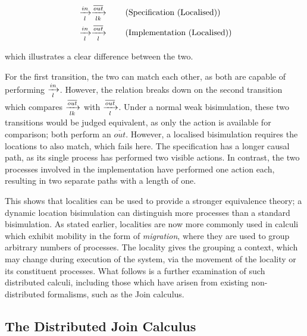 \begin{align}
& \xrightarrow[l]{in} \xrightarrow[lk]{\overline{out}} \tag{Specification
(Localised)} \\
& \xrightarrow[l]{in} \xrightarrow[l]{\overline{out}} \tag{Implementation (Localised)}
\end{align}

\noindent which illustrates a clear difference between the two.

For the first transition, the two can match each other, as both are
capable of performing $\xrightarrow[l]{in}$.  However, the relation
breaks down on the second transition which compares $\xrightarrow[lk]{\overline{out}}$
with $\xrightarrow[l]{\overline{out}}$.  Under a normal weak
bisimulation, these two transitions would be judged equivalent, as only
the action is available for comparison; both perform an
$\overline{out}$.  However, a localised bisimulation requires the
locations to also match, which fails here.  The specification has a
longer causal path, as its single process has performed two visible
actions.  In contrast, the two processes involved in the implementation
have performed one action each, resulting in two separate paths with a
length of one.

This shows that localities can be used to provide a stronger equivalence
theory; a dynamic location bisimulation can distinguish more processes
than a standard bisimulation.  As stated earlier, localities are now
more commonly used in calculi which exhibit mobility in the form of
\emph{migration}, where they are used to group arbitrary numbers of
processes.  The locality gives the grouping a context, which may change
during execution of the system, via the movement of the locality or its
constituent processes.  What follows is a further examination of such
distributed calculi, including those which have arisen from existing
non-distributed formalisms, such as the Join calculus.



\subsection{The Distributed Join Calculus}

